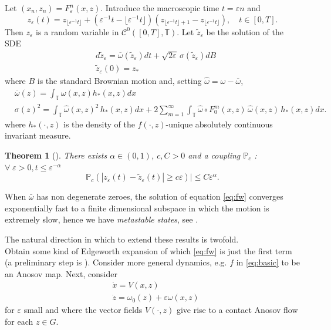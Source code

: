 \documentclass[10pt, a4paper, reqno]{amsart}
\newtheorem*{thm*}{Theorem}
\newcommand\cC{{\mathcal C}}
\newcommand\bP{{\mathbb P}}
\newcommand\bT{{\mathbb T}}
\newcommand\ve{\varepsilon}
\begin{document}
Let $(x_n,z_n)=F_\ve^n(x,z)$.
Introduce the macroscopic time $t=\ve n$ and
\begin{equation}\label{eq:detp}
z_\ve(t)=z_{\lfloor\ve^{-1} t\rfloor}+(\ve^{-1} t- \lfloor\ve^{-1} t\rfloor)(z_{\lfloor\ve^{-1} t\rfloor+1}-z_{\lfloor\ve^{-1} t\rfloor}),\quad t\in[0,T].
\end{equation}
Then $z_\ve$ is a random variable in $\cC^0([0,T],\bT)$. 
Let $\tilde z_\ve$ be the solution of the SDE
\begin{equation}\label{eq:fw}
\begin{split}
&d\tilde z_\ve=\overline\omega(\tilde z_\ve)dt+\sqrt{2\ve}\,\sigma(\tilde z_\ve) dB\\
&\tilde z_\ve(0)=z_*
\end{split}
\end{equation}
where $B$ is the standard Brownian motion and, setting $\hat\omega=\omega-\overline \omega$,
\[
\begin{split}
&\overline \omega(z)=\int_{\bT} \omega(x,z) h_*(x,z) dx\\
&\sigma(z)^2=\int_{\bT}\hat \omega(x,z)^2\, h_*(x,z)dx+2\sum_{m=1}^\infty \int_{\bT} \hat\omega\circ F_0^m(x,z)\, \hat\omega(x,z)\, h_*(x,z)dx.
\end{split}
\]
where $h_*(\cdot,z)$ is the density of the $f(\cdot,z)$-unique absolutely continuous invariant measure.
\begin{thm*}[\cite{DL18, DeLPVb}]
There exists $\alpha\in (0,1)$, $c,C>0$ and a coupling $\bP_c$ : $\forall \;\ve>0, t\leq \ve^{-\alpha}$
\begin{equation}\label{eq:sharp}
\bP_c(|z_\ve(t)- \tilde z_\ve(t)|\geq c\ve)|\leq C\ve^{\alpha}.
\end{equation}
\end{thm*}
\noindent
When $\bar \omega$ has non degenerate zeroes, the solution of equation \eqref{eq:fw} converges exponentially fast to a finite dimensional subspace in which the motion is extremely slow, hence we have {\em metastable states}, see \cite{DeLPVb}.

The natural direction in which to extend these results is twofold.\\
Obtain some kind of Edgeworth expansion of which \eqref{eq:fw} is just the first term (a preliminary step is \cite{KL19}).
Consider more general dynamics, e.g. $f$ in \eqref{eq:basic} to be an Anosov map. Next, consider
\begin{equation}\label{eq:flow}
\begin{split}
&\dot x=V(x,z)\\
&\dot z=\omega_0(z)+\ve\omega(x,z)
\end{split}
\end{equation}
for $\ve$ small and where the vector fields $V(\cdot,z)$ give rise to a contact Anosov flow for each $z\in G$.
\end{document}
